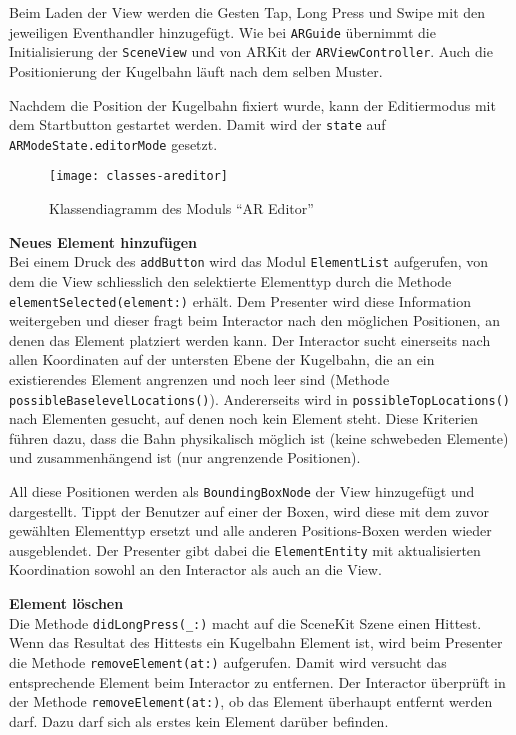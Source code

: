 Beim Laden der View werden die Gesten Tap, Long Press und Swipe mit den jeweiligen Eventhandler hinzugefügt.
Wie bei \texttt{ARGuide} übernimmt die Initialisierung der \texttt{SceneView} und von ARKit der \texttt{ARViewController}.
Auch die Positionierung der Kugelbahn läuft nach dem selben Muster.

Nachdem die Position der Kugelbahn fixiert wurde, kann der Editiermodus mit dem Startbutton gestartet werden.
Damit wird der \texttt{state} auf \texttt{ARModeState.editorMode} gesetzt.

\begin{figure}[htb!]
	\centering
	\texttt{[image: classes-areditor]}%
	\caption{Klassendiagramm des Moduls "`AR Editor"'}%
	\label{fig:classes-areditor}%
\end{figure}

\textbf{Neues Element hinzufügen} \\
Bei einem Druck des \texttt{addButton} wird das Modul \texttt{ElementList} aufgerufen, von dem die View schliesslich den selektierte Elementtyp durch die Methode \texttt{elementSelected(element:)} erhält.
Dem Presenter wird diese Information weitergeben und dieser fragt beim Interactor nach den möglichen Positionen, an denen das Element platziert werden kann.
Der Interactor sucht einerseits nach allen Koordinaten auf der untersten Ebene der Kugelbahn, die an ein existierendes Element angrenzen und noch leer sind (Methode \texttt{possibleBaselevelLocations()}).
Andererseits wird in \texttt{possibleTopLocations()} nach Elementen gesucht, auf denen noch kein Element steht.
Diese Kriterien führen dazu, dass die Bahn physikalisch möglich ist (keine schwebeden Elemente) und zusammenhängend ist (nur angrenzende Positionen).

All diese Positionen werden als \texttt{BoundingBoxNode} der View hinzugefügt und dargestellt.
Tippt der Benutzer auf einer der Boxen, wird diese mit dem zuvor gewählten Elementtyp ersetzt und alle anderen Positions-Boxen werden wieder ausgeblendet.
Der Presenter gibt dabei die \texttt{ElementEntity} mit aktualisierten Koordination sowohl an den Interactor als auch an die View.

\textbf{Element löschen} \\
Die Methode \texttt{didLongPress(\_:)} macht auf die SceneKit Szene einen Hittest.
Wenn das Resultat des Hittests ein Kugelbahn Element ist, wird beim Presenter die Methode \texttt{removeElement(at:)} aufgerufen.
Damit wird versucht das entsprechende Element beim Interactor zu entfernen.
Der Interactor überprüft in der Methode \texttt{removeElement(at:)}, ob das Element überhaupt entfernt werden darf.
Dazu darf sich als erstes kein Element darüber befinden.


